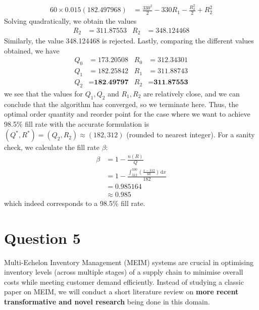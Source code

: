 \documentclass[12pt]{article}
\begin{document}
\begin{align*}
    60\times 0.015(182.497968) &= \frac{330^{2}}{2} - 330 R_{1} - \frac{R_{2}^{2}}{2} + R_{2}^{2} 
\end{align*} Solving quadratically, we obtain the values \begin{align*}
    R_{2} &= \mathbf{311.87553} & R_{2} &= 348.124468
\end{align*} Similarly, the value 348.124468 is rejected. Lastly, comparing the different values obtained, we have \begin{align*}
    Q_{0} &= 173.20508 & R_{0} &= 312.34301 \\ 
    Q_{1} &= 182.25842 & R_{1} &= 311.88743 \\ 
    Q_{2} &= \textbf{182.49797} & R_{2} &= \textbf{311.87553}
\end{align*} we see that the values for $Q_{1}, Q_{2}$ and $R_{1}, R_{2}$ are relatively close, and we can conclude that the algorithm has converged, so we terminate here. Thus, the optimal order quantity and reorder point for the case where we want to achieve 98.5\% fill rate with the accurate formulation is $(Q^{*}, R^{*}) = (Q_{2}, R_{2}) \approx (182, 312)$ (rounded to nearest integer). For a sanity check, we calculate the fill rate $\beta$: \begin{align*}
    \beta &= 1- \frac{n(R)}{Q} \\ 
    &= 1- \frac{ \displaystyle\int_{312}^{330} \left( \frac{x-312}{60} \right) \, \mathrm{d}x}{182} \\ 
    &= 0.985164 \\ 
    &\approx 0.985
\end{align*} which indeed corresponds to a 98.5\% fill rate. 

\newpage 

\section*{Question 5}


Multi-Echelon Inventory Management (MEIM) systems are crucial in optimising inventory levels (across multiple stages) of a supply chain to minimise overall costs while meeting customer demand efficiently. Instead of studying a classic paper on MEIM, we will conduct a short literature review on \textbf{more recent transformative and novel research} being done in this domain. \\
\end{document}
